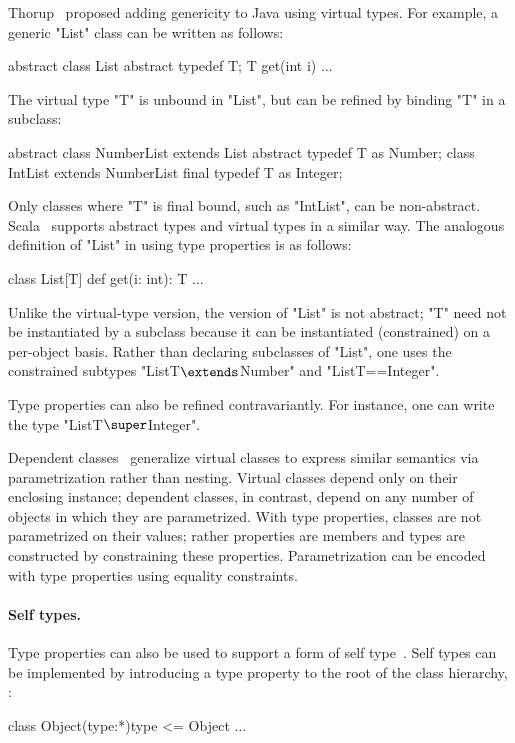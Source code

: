Thorup~\cite{thorup97}
proposed adding genericity to Java using virtual types.  For example,
a generic \xcd"List" class can be written as follows:
{
\begin{xten}
abstract class List {
  abstract typedef T;
  T get(int i) { ... }
}
\end{xten}}
\noindent
The virtual type \xcd"T" is unbound in \xcd"List", but 
can be refined by binding \xcd"T" in a subclass:
{
\begin{xten}
abstract class NumberList extends List {
  abstract typedef T as Number;
}
class IntList extends NumberList {
  final typedef T as Integer;
}
\end{xten}}
\noindent
Only classes where \xcd"T" is final bound, such as \xcd"IntList",
can be non-abstract.  Scala~\cite{scala} supports abstract types
and virtual types in a similar way.
%
The analogous definition of 
\xcd"List" in \Xten{} using type properties is as follows:
{
\begin{xten}
class List[T] {
  def get(i: int): T { ... }
}
\end{xten}}

\noindent
Unlike the virtual-type version,
the \Xten{} version of \xcd"List" is not abstract;
\xcd"T" need not be instantiated by a subclass because it can be
instantiated (constrained) on a per-object basis.
Rather than declaring subclasses of \xcd"List",
one uses the constrained subtypes
\xcdmath"List{T$\extends$Number}" and \xcd"List{T==Integer}".

Type properties can also be refined contravariantly.
For instance, one can write the type \xcdmath"List{T$\super$Integer}".

Dependent classes~\cite{dependent-classes} generalize virtual
classes to express similar semantics via parametrization rather
than nesting.  Virtual classes depend only on their enclosing
instance; dependent classes, in contrast, depend on any number
of objects in which they are parametrized.  With type
properties, classes are not parametrized on their values;
rather properties are members and types are constructed by
constraining these properties.  Parametrization can be 
encoded with type properties using equality constraints.

\paragraph{Self types.}

Type properties can also be used to support a form of self
type~\cite{bruce-binary,bsg95}.
%
Self types can be implemented by introducing a
type property  to the root of the class hierarchy,
:
\begin{xtenmath}
class Object(type:*){type <= Object} { $\dots$ }
\end{xtenmath}

